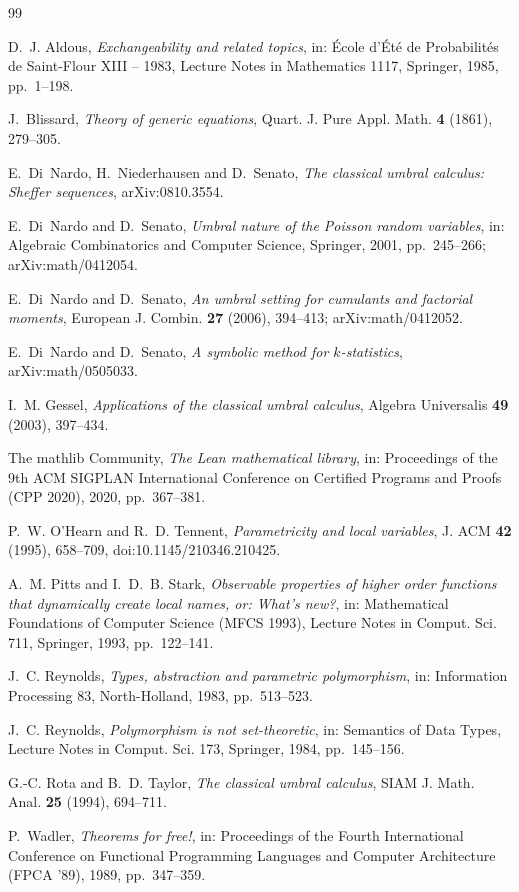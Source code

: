 \documentclass[11pt,a4paper]{report}
\theoremstyle{plain}
\theoremstyle{definition}
\theoremstyle{remark}
\begin{document}
\begin{thebibliography}{99}

D.~J. Aldous,
\emph{Exchangeability and related topics},
in: \'Ecole d'\'Et\'e de Probabilit\'es de Saint-Flour XIII -- 1983,
Lecture Notes in Mathematics 1117, Springer, 1985, pp.~1--198.

J.~Blissard,
\emph{Theory of generic equations},
Quart. J. Pure Appl. Math. \textbf{4} (1861), 279--305.

E.~Di~Nardo, H.~Niederhausen and D.~Senato,
\emph{The classical umbral calculus: Sheffer sequences},
arXiv:0810.3554.

E.~Di~Nardo and D.~Senato,
\emph{Umbral nature of the Poisson random variables},
in: Algebraic Combinatorics and Computer Science, Springer, 2001, pp.~245--266;
arXiv:math/0412054.

E.~Di~Nardo and D.~Senato,
\emph{An umbral setting for cumulants and factorial moments},
European J. Combin. \textbf{27} (2006), 394--413; arXiv:math/0412052.

E.~Di~Nardo and D.~Senato,
\emph{A symbolic method for $k$-statistics},
arXiv:math/0505033.

I.~M. Gessel,
\emph{Applications of the classical umbral calculus},
Algebra Universalis \textbf{49} (2003), 397--434.

The mathlib Community,
\emph{The Lean mathematical library},
in: Proceedings of the 9th ACM SIGPLAN International Conference on Certified
Programs and Proofs (CPP 2020), 2020, pp.~367--381.

P.~W. O'Hearn and R.~D. Tennent,
\emph{Parametricity and local variables},
J. ACM \textbf{42} (1995), 658--709, doi:10.1145/210346.210425.

A.~M. Pitts and I.~D.~B. Stark,
\emph{Observable properties of higher order functions that dynamically create
local names, or: What's new?},
in: Mathematical Foundations of Computer Science (MFCS 1993), Lecture Notes in
Comput. Sci. 711, Springer, 1993, pp.~122--141.

J.~C. Reynolds,
\emph{Types, abstraction and parametric polymorphism},
in: Information Processing 83, North-Holland, 1983, pp.~513--523.

J.~C. Reynolds,
\emph{Polymorphism is not set-theoretic},
in: Semantics of Data Types, Lecture Notes in Comput. Sci. 173, Springer, 1984,
pp.~145--156.

G.-C. Rota and B.~D. Taylor,
\emph{The classical umbral calculus},
SIAM J. Math. Anal. \textbf{25} (1994), 694--711.

P.~Wadler,
\emph{Theorems for free!},
in: Proceedings of the Fourth International Conference on Functional Programming
Languages and Computer Architecture (FPCA '89), 1989, pp.~347--359.

\end{thebibliography}
\end{document}
